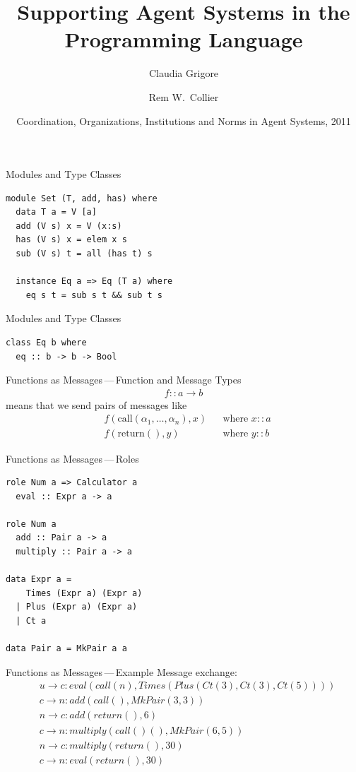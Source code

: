 \documentclass{beamer}
\title{Supporting Agent Systems in the Programming Language}
\author{Claudia Grigore \and Rem W.~Collier}
\institute{
  School of Computer Science\\
  University College Dublin\\
  IRCSET}
\date[COIN~2011]{Coordination, Organizations, Institutions and Norms
  in Agent Systems, 2011}
\begin{document}
\begin{frame}
  \titlepage
\end{frame}

\begin{frame}[fragile]{Modules and Type Classes}
\begin{lstlisting}
module Set (T, add, has) where
  data T a = V [a]
  add (V s) x = V (x:s)
  has (V s) x = elem x s
  sub (V s) t = all (has t) s

  instance Eq a => Eq (T a) where
    eq s t = sub s t && sub t s
\end{lstlisting}
\end{frame}

\begin{frame}[fragile]{Modules and Type Classes}

\begin{lstlisting}
class Eq b where
  eq :: b -> b -> Bool
\end{lstlisting}
\end{frame}

\begin{frame}[fragile]{Functions as Messages\,---\,Function and Message Types}
\begin{align*}
f :: a \to b
\end{align*}
means that we send pairs of messages like
\begin{align*}
&f(\mathrm{call}(\alpha_1,\ldots,\alpha_n), x) &&\text{where $x::a$}\\
&f(\mathrm{return}(),y) &&\text{where $y::b$}
\end{align*}
\end{frame}

\begin{frame}[fragile]{Functions as Messages\,---\,Roles}
\begin{lstlisting}
role Num a => Calculator a
  eval :: Expr a -> a

role Num a
  add :: Pair a -> a
  multiply :: Pair a -> a

data Expr a =
    Times (Expr a) (Expr a)
  | Plus (Expr a) (Expr a)
  | Ct a

data Pair a = MkPair a a
\end{lstlisting}
\end{frame}

\begin{frame}[fragile]{Functions as Messages\,---\,Example}
Message exchange:
\begin{align*}
&u\to c: eval(call(n), Times(Plus(Ct(3), Ct(3), Ct(5))))\\
&c\to n: add(call(), MkPair(3,3))\\
&n\to c: add(return(),6)\\
&c\to n: multiply(call()(), MkPair(6,5))\\
&n\to c: multiply(return(), 30)\\
&c\to n: eval(return(), 30)
\end{align*}
\end{frame}
\end{document}
